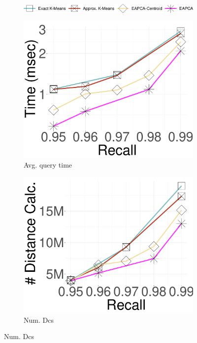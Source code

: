 \begin{figure}[tb] 
	\captionsetup{justification=centering}
	\centering
	\begin{subfigure}{\columnwidth}
 \centering
		\includegraphics[width=0.7\columnwidth]{../img/elpis/ElpisvsKmeans/legend.pdf}
	\end{subfigure}	
	\begin{subfigure}{\sfig\columnwidth}
		\captionsetup{justification=centering}
		\centering
		\includegraphics[width=\columnwidth]{../img/elpis/ElpisvsKmeans/qrstime.pdf}      
		\caption{Avg. query time} 
		\label{fig:elpis_kmeans:proc}
	\end{subfigure}	
 \hspace{0.4cm}
	\begin{subfigure}{\sfig\columnwidth}
		\captionsetup{justification=centering}
		\centering
		\includegraphics[width=\columnwidth]{../img/elpis/ElpisvsKmeans/qrsdc.pdf}                                                        
		\caption{Num. Dcs} 
		\label{fig:elpis_kmeans:distances}
	\end{subfigure}		



\end{figure}

